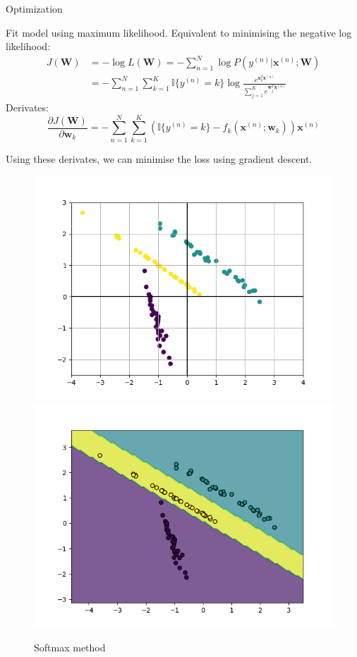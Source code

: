 \documentclass[a4paper, 11pt]{article}
\begin{document}
{\large Optimization}

Fit model using maximum likelihood. Equivalent to minimising the negative log likelihood:
\begin{align*}
        J(\mathbf{W}) &= -\log{L(\mathbf{W})} = -\sum\limits_{n = 1}^{N}\log{P(y^{(n)}|\mathbf{x}^{(n)};\mathbf{W})}\\
        &= -\sum\limits_{n = 1}^{N}\sum\limits_{k = 1}^{K}\mathbb{I}\{y^{(n)}=k\}\log{\frac{e^{\mathbf{x}_{k}^{T}\mathbf{x}^{(n)}}}{\sum\limits_{j = 1}^{K}e^{\mathbf{w}_j^{T}\mathbf{x}^{(n)}}}}
\end{align*}
Derivates:
\begin{equation*}
        \frac{\partial J(\mathbf{W})}{\partial\mathbf{w}_k} = -\sum\limits_{n = 1}^{N}\sum\limits_{k = 1}^{K}\left(\mathbb{I}\{y^{(n)}=k\} - f_k(\mathbf{x}^{(n)};\mathbf{w}_k)\right)\mathbf{x}^{(n)}
\end{equation*}

Using these derivates, we can minimise the loss using gradient descent.

\begin{figure}[H]
        \centering
        \includegraphics[scale=0.5]{test.png}
        \includegraphics[scale=0.5]{softmax.png}

        \caption{Softmax method}
\end{figure}
\end{document}
